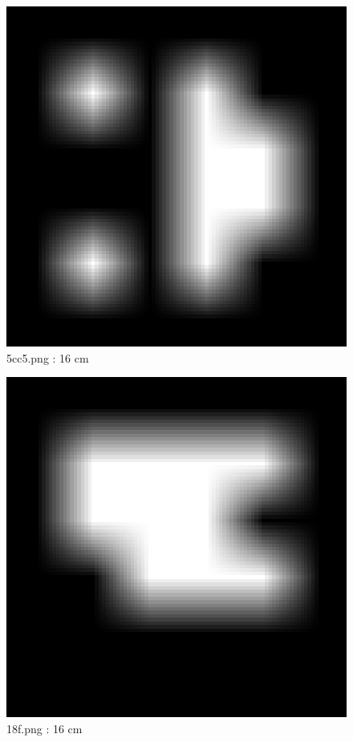 \documentclass[11pt,a4,BCOR=0cm]{scrartcl}
\begin{document}
\newpage
\begin{figure}
  \begin{center}
    \includegraphics[natwidth=6,natheight=6,width=16cm]{5cc5.png}
    \caption{5cc5.png : 16 cm}
    \label{fig:5cc5.png}
  \end{center}
\end{figure}
\newpage
\begin{figure}
  \begin{center}
    \includegraphics[natwidth=6,natheight=6,width=16cm]{18f.png}
    \caption{18f.png : 16 cm}
    \label{fig:18f.png}
  \end{center}
\end{figure}
\end{document}
